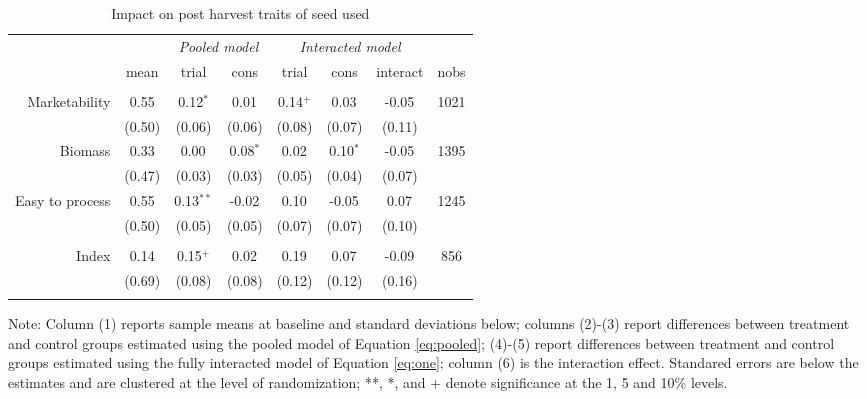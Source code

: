 \documentclass[english]{article}\usepackage[]{graphicx}\usepackage[]{xcolor}
\begin{document}
\begin{sidewaystable}
\caption{Impact on post harvest traits of seed used\label{ph_traits_used}}

\footnotesize
\begin{center}
\begin{tabular}{rccccccc}
\hline\hline
& & \multicolumn{2}{c}{\textit{Pooled model}} & \multicolumn{3}{c}{\textit{Interacted model}} \\
& mean & trial & cons & trial & cons & interact & nobs \\
\hline
\\
Marketability
& 0.55
& 0.12$^{*}$
& 0.01$^{}$ 
& 0.14$^{+}$ 
& 0.03$^{}$
& -0.05$^{}$ & 1021 \\

& (0.50) & (0.06)  & (0.06) & (0.08)  & (0.07)  & (0.11)
 \\

Biomass
& 0.33
& 0.00$^{}$
& 0.08$^{*}$ 
& 0.02$^{}$ 
& 0.10$^{*}$
& -0.05$^{}$ & 1395 \\

& (0.47) & (0.03)  & (0.03) & (0.05)  & (0.04)  & (0.07)
 \\

Easy to process
& 0.55
& 0.13$^{**}$
& -0.02$^{}$ 
& 0.10$^{}$ 
& -0.05$^{}$
& 0.07$^{}$ & 1245 \\

& (0.50) & (0.05)  & (0.05) & (0.07)  & (0.07)  & (0.10)
 \\
\\
Index
& 0.14
& 0.15$^{+}$
& 0.02$^{}$ 
& 0.19$^{}$ 
& 0.07$^{}$
& -0.09$^{}$ & 856 \\

& (0.69) & (0.08)  & (0.08) & (0.12)  & (0.12)  & (0.16)
 \\

\\
\hline\hline
\end{tabular}
\end{center}
\scriptsize
Note: Column (1) reports sample means at baseline and standard deviations below;  columns (2)-(3) report differences between treatment and control groups estimated using the pooled model of Equation  \ref{eq:pooled}; (4)-(5) report differences between treatment and control groups estimated using the fully interacted model of Equation \ref{eq:one}; column (6) is the interaction effect. Standared errors are below the estimates and are clustered at the level of randomization; **, *, and + denote significance at the 1, 5 and 10\% levels.
\end{sidewaystable}
\end{document}
